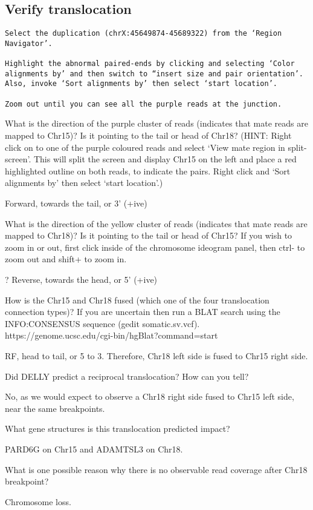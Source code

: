 \subsection{Verify translocation}
\begin{advanced}

\begin{lstlisting}
Select the duplication (chrX:45649874-45689322) from the ‘Region Navigator’. 

Highlight the abnormal paired-ends by clicking and selecting ‘Color alignments by’ and then switch to “insert size and pair orientation’. Also, invoke ‘Sort alignments by’ then select ‘start location’.

Zoom out until you can see all the purple reads at the junction.
\end{lstlisting}
\end{advanced}


\begin{questions}
What is the direction of the purple cluster of reads (indicates that mate reads are mapped to Chr15)? Is it pointing to the tail or head of Chr18? 
(HINT: Right click on to one of the purple coloured reads and select ‘View mate region in split-screen’. This will split the screen and display Chr15 on the left and place a red highlighted outline on both reads, to indicate the pairs. Right click and ‘Sort alignments by’ then select ‘start location’.)
\begin{answer}
Forward, towards the tail, or 3’ (+ive)
\end{answer}

What is the direction of the yellow cluster of reads (indicates that mate reads are mapped to Chr18)? Is it pointing to the tail or head of Chr15? 
If you wish to zoom in or out, first click inside of the chromosome ideogram panel, then ctrl- to zoom out and shift+ to zoom in. 
\begin{answer}
? Reverse, towards the head, or 5’ (+ive)
\end{answer}

How is the Chr15 and Chr18 fused (which one of the four translocation connection types)?  If you are uncertain then run a BLAT search using the INFO:CONSENSUS sequence (gedit  somatic.sv.vcf). https://genome.ucsc.edu/cgi-bin/hgBlat?command=start
\begin{answer}
RF, head to tail, or 5 to 3. Therefore, Chr18 left side is fused to Chr15 right side.
\end{answer}
Did DELLY predict a reciprocal translocation? How can you tell? 
\begin{answer}
No, as we would expect to observe a Chr18 right side fused to Chr15 left side, near the same breakpoints.  
\end{answer}
What gene structures is this translocation predicted impact? 
\begin{answer}
PARD6G on Chr15 and ADAMTSL3 on Chr18.
\end{answer}
What is one possible reason why there is no observable read coverage after Chr18 breakpoint? 
\begin{answer}
Chromosome loss.
\end{answer}
\end{questions}

